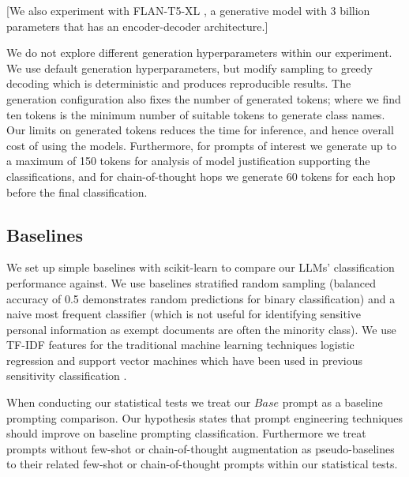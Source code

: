 [We also experiment with FLAN-T5-XL \cite{chung2022scaling}, a generative model with 3 billion parameters that has an encoder-decoder architecture.]

We do not explore different generation hyperparameters within our experiment. We use default generation hyperparameters, but modify sampling to greedy decoding which is deterministic and produces reproducible results. The generation configuration also fixes the number of generated tokens; where we find ten tokens is the minimum number of suitable tokens to generate class names. Our limits on generated tokens reduces the time for inference, and hence overall cost of using the models. Furthermore, for prompts of interest we generate up to a maximum of 150 tokens for analysis of model justification supporting the classifications, and for chain-of-thought hops we generate 60 tokens for each hop before the final classification.

\subsection{Baselines}
We set up simple baselines with scikit-learn to compare our LLMs’ classification performance against. We use baselines stratified random sampling (balanced accuracy of 0.5 demonstrates random predictions for binary classification) and a naive most frequent classifier (which is not useful for identifying sensitive personal information as exempt documents are often the minority class). We use TF-IDF features for the traditional machine learning techniques logistic regression and support vector machines which have been used in previous sensitivity classification \cite{mckechnie2024sara}.

When conducting our statistical tests we treat our $Base$ prompt as a baseline prompting comparison. Our hypothesis states that prompt engineering techniques should improve on baseline prompting classification. Furthermore we treat prompts without few-shot or chain-of-thought augmentation as pseudo-baselines to their related few-shot or chain-of-thought prompts within our statistical tests.

